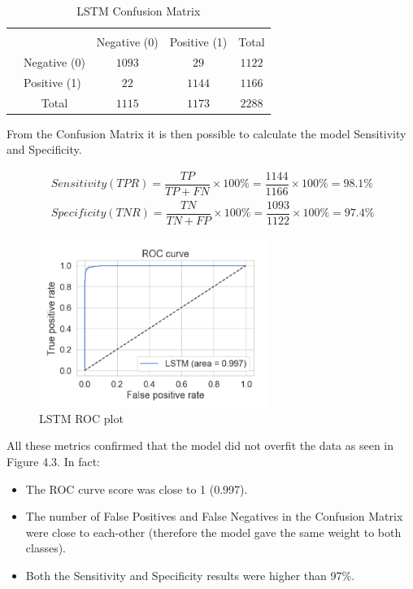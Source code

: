 {
\begin{table}[h!]
\centering
\begin{tabular}{l|l|c|c|c}
\multicolumn{2}{c}{}&\multicolumn{2}{c}{}&\\
\cline{3-4}
\multicolumn{2}{c|}{}&Negative (0)&Positive (1)&\multicolumn{1}{c}{Total}\\
\cline{2-4}
\multirow{}{}{}& Negative (0) & $1093$ & $29$ & $1122$\\
\cline{2-4}
& Positive (1) & $22$ & $1144$ & $1166$\\
\cline{2-4}
\multicolumn{1}{c}{} & \multicolumn{1}{c}{Total} & \multicolumn{1}{c}{$1115$} & \multicolumn{    1}{c}{$1173$} & \multicolumn{1}{c}{$2288$}\\
\end{tabular}
\caption{LSTM Confusion Matrix}
\label{table:1}
\end{table}
}


From the Confusion Matrix it is then possible to calculate the model Sensitivity and Specificity.

\begin{align}
\ Sensitivity (TPR) = \dfrac{TP}{TP + FN}\times100\% = \dfrac{1144}{1166}\times100\% = 98.1\% \label{eq:1} \\
\ Specificity (TNR)  = \dfrac{TN}{TN + FP}\times100\%
= \dfrac{1093}{1122}\times100\% = 97.4\%
\end{align}

\begin{figure}[ht!]%
    \centering
    \includegraphics[width=7.5cm]{images/lstmorc.PNG}%
    \caption{LSTM ROC plot}
\end{figure}

All these metrics confirmed that the model did not overfit the data as seen in Figure 4.3. In fact: 
\begin{itemize}
\itemsep0em
\item The ROC curve score was close to 1 (0.997).
\item The number of False Positives and False Negatives in the Confusion Matrix were close to each-other (therefore the model gave the same weight to both classes).
\item Both the Sensitivity and Specificity results were higher than 97\%.
\end{itemize}

